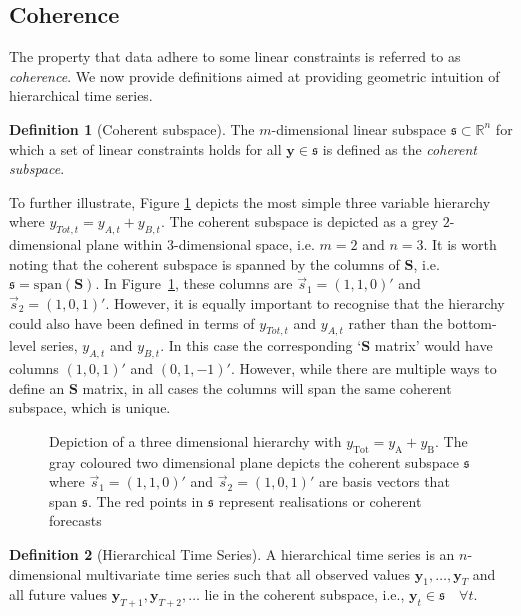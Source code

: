 \documentclass[12pt]{article}
\theoremstyle{definition}
\newtheorem{definition}{Definition}[section]
\theoremstyle{property}
\begin{document}
	\subsection{Coherence}\label{sec:cohpointf}
	
	The property that data adhere to some linear constraints is referred to as {\em coherence}.  We now provide definitions aimed at providing geometric intuition of hierarchical time series.
	
	 \begin{definition}[Coherent subspace]\label{def:cohspace}
	 	The $m$-dimensional linear subspace $\mathfrak{s}\subset \mathbb{R}^n$ for which a set of linear constraints holds for all $\bm{y}\in\mathfrak{s}$ is defined as the \emph{coherent subspace}.
	 \end{definition}
     To further illustrate, Figure \ref{fig:3D_hierarchy} depicts the most simple three variable hierarchy where $y_{Tot,t}=y_{A,t}+y_{B,t}$.  The coherent subspace is depicted as a grey $2$-dimensional plane within $3$-dimensional space, i.e. $m=2$ and $n=3$.  It is worth noting that the coherent subspace is spanned by the columns of $\bm{S}$, i.e.\ $\mathfrak{s}=\text{span}(\bm{S})$.  In Figure~\ref{fig:3D_hierarchy}, these columns are $\vec{s}_1=(1,1,0)'$ and $\vec{s}_2=(1,0,1)'$.  However, it is equally important to recognise that the hierarchy could also have been defined in terms of $y_{Tot,t}$ and $y_{A,t}$ rather than the bottom-level series, $y_{A,t}$ and $y_{B,t}$. In this case the corresponding `$\bm{S}$ matrix' would have columns $(1,0,1)'$ and $(0,1,-1)'$.  However, while there are multiple ways to define an $\bm{S}$ matrix, in all cases the columns will span the same coherent subspace, which is unique.

     \begin{figure}[H]
     	\centering
     	\vspace{-0.9cm}
     	\small
     	\resizebox{\linewidth}{!}{
     		
     	}
     	\caption{Depiction of a three dimensional hierarchy with $y_{\text{Tot}} = y_{\text{A}} + y_{\text{B}}$. The gray coloured two dimensional plane depicts the coherent subspace $\mathfrak{s}$ where $\vec{s}_1 = (1,1,0)'$ and $\vec{s}_2 = (1, 0, 1)'$ are basis vectors that span $\mathfrak{s}$. The red points in $\mathfrak{s}$ represent realisations or coherent forecasts}\label{fig:3D_hierarchy}
     \end{figure}

	 \begin{definition}[Hierarchical Time Series]\label{def:cohspace}
	 	A hierarchical time series is an $n$-dimensional multivariate time series such that all observed values $\bm{y}_1,\ldots,\bm{y}_T$ and all future values $\bm{y}_{T+1},\bm{y}_{T+2},\ldots$  lie in the coherent subspace, i.e., $\bm{y}_t\in\mathfrak{s}\quad\forall t$.
	 \end{definition}
\end{document}

